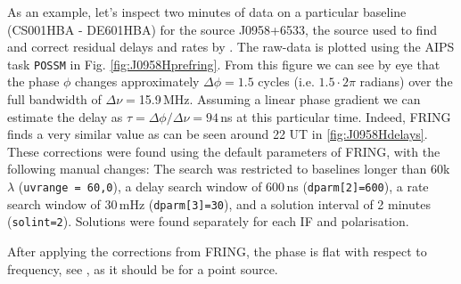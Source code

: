 As an example, let's inspect two minutes of data on a particular baseline
(CS001HBA - DE601HBA) for the source J0958+6533, the source used to find and
correct residual delays and rates by \cite{varenius2014}.  The raw-data is
plotted using the AIPS task \verb!POSSM!  in Fig. \ref{fig:J0958Hprefring}.
From this figure we can see by eye that the phase $\phi$ changes approximately
$\Delta \phi=1.5$ cycles (i.e.  $1.5\cdot2\pi$ radians) over the full bandwidth
of $\Delta \nu=$15.9\,MHz.  Assuming a linear phase gradient we can estimate
the delay as $\tau = \Delta \phi / \Delta \nu=94$\,ns at this particular time.
Indeed, FRING finds a very similar value as can be seen around 22 UT in
\ref{fig:J0958Hdelays}.  These corrections were found using the default parameters of FRING,
with the following manual changes: The search was restricted to baselines longer than 60k$\lambda$ (\verb!uvrange = 60,0!), 
a delay search window of 600\,ns (\verb!dparm[2]=600!), a rate search window of 30\,mHz (\verb!dparm[3]=30!), and a solution interval of
2 minutes (\verb!solint=2!).  Solutions were found separately for each IF and polarisation.

After applying the corrections from FRING, the phase
is flat with respect to frequency, see , as it
should be for a point source.

